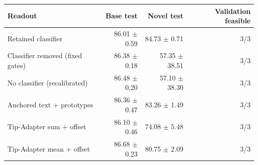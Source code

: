 \begin{tabular}{lrrr}
\toprule
Readout & Base test & Novel test & Validation feasible \\
\midrule
Retained classifier & 86.01 $\pm$ 0.59 & 84.73 $\pm$ 0.71 & 3/3 \\
Classifier removed (fixed gates) & 86.38 $\pm$ 0.18 & 57.35 $\pm$ 38.51 & 3/3 \\
No classifier (recalibrated) & 86.48 $\pm$ 0.20 & 57.10 $\pm$ 38.30 & 3/3 \\
Anchored text + prototypes & 86.36 $\pm$ 0.47 & 83.26 $\pm$ 1.49 & 3/3 \\
Tip-Adapter sum + offset & 86.10 $\pm$ 0.46 & 74.08 $\pm$ 5.48 & 3/3 \\
Tip-Adapter mean + offset & 86.68 $\pm$ 0.23 & 80.75 $\pm$ 2.09 & 3/3 \\
\bottomrule
\end{tabular}
